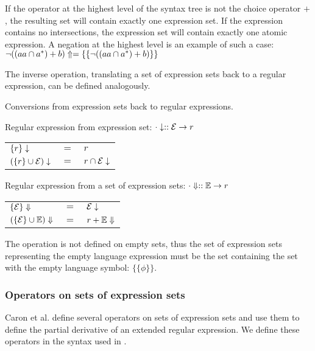 If the operator at the highest level of the syntax tree is not the choice
operator $+$, the resulting set will contain exactly one expression set. If the
expression contains no intersections, the expression set will contain exactly
one atomic expression. A negation at the highest level is an example of such a
case: $\neg((aa \cap a^*) + b)\Uparrow = \{\{\neg((aa \cap a^*) + b)\}\}$

The inverse operation, translating a set of expression sets back to a regular
expression, can be defined analogously.

\begin{defn}
   \label{defn-esets2re}
   Conversions from expression sets back to regular expressions.

   Regular expression from expression set: $\cdot\downarrow :: \mathcal{E} \to r$

   \begin{tabular}{lll}
      $\{r\}\downarrow$			& $=$	& $r$				\\
      $(\{r\} \cup \mathcal{E})\downarrow$	& $=$	& $r \cap \mathcal{E}\downarrow$	\\
   \end{tabular}

   Regular expression from a set of expression sets: $\cdot\Downarrow :: \mathbb{E} \to r$

   \begin{tabular}{lll}
      $\{\mathcal{E}\}\Downarrow$		& $=$	& $\mathcal{E}\downarrow$		\\
      $(\{\mathcal{E}\} \cup \mathbb{E})\Downarrow$	& $=$	& $r + \mathbb{E}\Downarrow$	\\
   \end{tabular}
\end{defn}

The operation is not defined on empty sets, thus the set of expression sets
representing the empty language expression must be the set containing the set
with the empty language symbol: $\{\{\phi\}\}$.

\subsubsection{Operators on sets of expression sets}

Caron et al. define several operators on sets of expression sets and use them to
define the partial derivative of an extended regular expression\cite{pdere}. We
define these operators in the syntax used in \cite{pdpat}.


